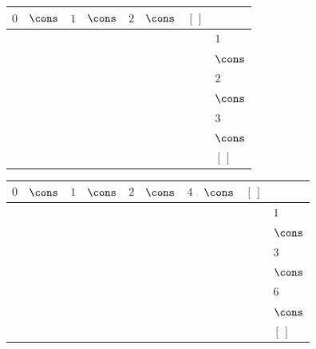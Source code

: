 {\scriptsize\setlength{\tabcolsep}{1.5pt}%
\begin{tabular}{ccccccc|l}
$0$ & $\cons$ & $1$ & $\cons$ & $2$ & $\cons$ & $[\,]$ & \\ \hline
\gcell{$\posD{\bullet}$} & \gcell{$\posC{\circ}$} & \gcell{$$} & \gcell{$$} & \gcell{$$} & \gcell{$$} & \gcell{$$} & $1$ \\
\gcell{$$} & \gcell{$\posC{\circ}$} & \gcell{$$} & \gcell{$$} & \gcell{$$} & \gcell{$$} & \gcell{$$} & $\cons$ \\
\gcell{$$} & \gcell{$\posC{\circ}$} & \gcell{$\posD{\bullet}$} & \gcell{$\posC{\circ}$} & \gcell{$$} & \gcell{$$} & \gcell{$$} & $2$ \\
\gcell{$$} & \gcell{$\posC{\circ}$} & \gcell{$$} & \gcell{$\posC{\circ}$} & \gcell{$$} & \gcell{$$} & \gcell{$$} & $\cons$ \\
\gcell{$$} & \gcell{$\posC{\circ}$} & \gcell{$$} & \gcell{$\posC{\circ}$} & \gcell{$\posD{\bullet}$} & \gcell{$\posC{\circ}$} & \gcell{$$} & $3$ \\
\gcell{$$} & \gcell{$\posC{\circ}$} & \gcell{$$} & \gcell{$\posC{\circ}$} & \gcell{$$} & \gcell{$\posC{\circ}$} & \gcell{$$} & $\cons$ \\
\gcell{$$} & \gcell{$\posC{\circ}$} & \gcell{$$} & \gcell{$\posC{\circ}$} & \gcell{$$} & \gcell{$\posC{\circ}$} & \gcell{$\posC{\circ}$} & $[\,]$ \\
\end{tabular}}
{\scriptsize\setlength{\tabcolsep}{1.5pt}%
\begin{tabular}{ccccccccc|l}
$0$ & $\cons$ & $1$ & $\cons$ & $2$ & $\cons$ & $4$ & $\cons$ & $[\,]$ & \\ \hline
\gcell{$\posD{\bullet}$} & \gcell{$\posC{\circ}$} & \gcell{$\posD{\bullet}$} & \gcell{$\posC{\circ}$} & \gcell{$$} & \gcell{$$} & \gcell{$$} & \gcell{$$} & \gcell{$$} & $1$ \\
\gcell{$$} & \gcell{$\posC{\circ}$} & \gcell{$$} & \gcell{$\posC{\circ}$} & \gcell{$$} & \gcell{$$} & \gcell{$$} & \gcell{$$} & \gcell{$$} & $\cons$ \\
\gcell{$$} & \gcell{$\posC{\circ}$} & \gcell{$\posD{\bullet}$} & \gcell{$\posC{\circ}$} & \gcell{$\posD{\bullet}$} & \gcell{$\posC{\circ}$} & \gcell{$$} & \gcell{$$} & \gcell{$$} & $3$ \\
\gcell{$$} & \gcell{$\posC{\circ}$} & \gcell{$$} & \gcell{$\posC{\circ}$} & \gcell{$$} & \gcell{$\posC{\circ}$} & \gcell{$$} & \gcell{$$} & \gcell{$$} & $\cons$ \\
\gcell{$$} & \gcell{$\posC{\circ}$} & \gcell{$$} & \gcell{$\posC{\circ}$} & \gcell{$\posD{\bullet}$} & \gcell{$\posC{\circ}$} & \gcell{$\posD{\bullet}$} & \gcell{$\posC{\circ}$} & \gcell{$$} & $6$ \\
\gcell{$$} & \gcell{$\posC{\circ}$} & \gcell{$$} & \gcell{$\posC{\circ}$} & \gcell{$$} & \gcell{$\posC{\circ}$} & \gcell{$$} & \gcell{$\posC{\circ}$} & \gcell{$$} & $\cons$ \\
\gcell{$$} & \gcell{$\posC{\circ}$} & \gcell{$$} & \gcell{$\posC{\circ}$} & \gcell{$$} & \gcell{$\posC{\circ}$} & \gcell{$$} & \gcell{$\posC{\circ}$} & \gcell{$\posC{\circ}$} & $[\,]$ \\
\end{tabular}}
